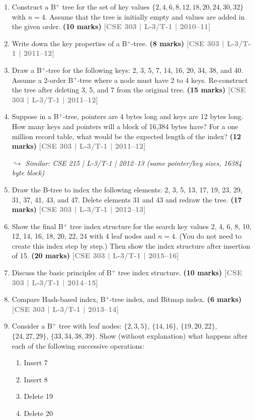 \documentclass[12pt,a3paper]{article}
\newcommand{\yr}[1]{\hfill\textcolor{gray}{\small\textbf{[#1]}}}
\newcommand{\mk}[1]{\textcolor{orange!70!black}{\small\textbf{(#1 marks)}}}
\newcommand{\variant}[1]{\par\vspace{1pt}\textcolor{blue!50!black}%
  {\footnotesize\textit{$\hookrightarrow$ Similar: #1}}}
\begin{document}
\begin{enumerate}

\item Construct a B$^+$ tree for the set of key values $\{2, 4, 6, 8, 12, 18, 20, 24, 30, 32\}$ with $n = 4$. Assume that the tree is initially empty and values are added in the given order.
\mk{10} \yr{CSE 303 | L-3/T-1 | 2010--11}

\item Write down the key properties of a B$^+$-tree.
\mk{8} \yr{CSE 303 | L-3/T-1 | 2011--12}

\item Draw a B$^+$-tree for the following keys: 2, 3, 5, 7, 14, 16, 20, 34, 38, and 40. Assume a 2-order B$^+$-tree where a node must have 2 to 4 keys. Re-construct the tree after deleting 3, 5, and 7 from the original tree.
\mk{15} \yr{CSE 303 | L-3/T-1 | 2011--12}

\item Suppose in a B$^+$-tree, pointers are 4 bytes long and keys are 12 bytes long. How many keys and pointers will a block of 16,384 bytes have? For a one million record table, what would be the expected length of the index?
\mk{12} \yr{CSE 303 | L-3/T-1 | 2011--12}

\variant{CSE 215 | L-3/T-1 | 2012--13 (same pointer/key sizes, 16384 byte block)}

\item Draw the B-tree to index the following elements: 2, 3, 5, 13, 17, 19, 23, 29, 31, 37, 41, 43, and 47. Delete elements 31 and 43 and redraw the tree.
\mk{17} \yr{CSE 303 | L-3/T-1 | 2012--13}

\item Show the final B$^+$ tree index structure for the search key values 2, 4, 6, 8, 10, 12, 14, 16, 18, 20, 22, 24 with 4 leaf nodes and $n = 4$. (You do not need to create this index step by step.) Then show the index structure after insertion of 15.
\mk{20} \yr{CSE 303 | L-3/T-1 | 2015--16}

\item Discuss the basic principles of B$^+$ tree index structure.
\mk{10} \yr{CSE 303 | L-3/T-1 | 2014--15}

\item Compare Hash-based index, B$^+$-tree index, and Bitmap index.
\mk{6} \yr{CSE 303 | L-3/T-1 | 2013--14}

\item Consider a B$^+$ tree with leaf nodes: $\{2,3,5\}$, $\{14,16\}$, $\{19,20,22\}$, $\{24,27,29\}$, $\{33,34,38,39\}$. Show (without explanation) what happens after each of the following successive operations:
\begin{enumerate}
  \item Insert 7
  \item Insert 8
  \item Delete 19
  \item Delete 20
\end{enumerate}


\end{enumerate}
\end{document}

